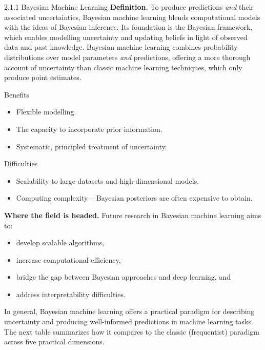 \documentclass[aspectratio=169,10pt]{beamer}
\begin{document}
\begin{frame}[allowframebreaks]{2.1.1 Bayesian Machine Learning}
  \textbf{Definition.} To produce predictions \emph{and} their associated
  uncertainties, Bayesian machine learning blends computational models with
  the ideas of Bayesian inference. Its foundation is the Bayesian framework,
  which enables modelling uncertainty and updating beliefs in light of
  observed data and past knowledge. Bayesian machine learning combines
  probability distributions over model parameters \emph{and} predictions,
  offering a more thorough account of uncertainty than classic machine
  learning techniques, which only produce point estimates.

  \begin{block}{Benefits}
    \begin{itemize}
      \item Flexible modelling.
      \item The capacity to incorporate prior information.
      \item Systematic, principled treatment of uncertainty.
    \end{itemize}
  \end{block}

  \framebreak

  \begin{block}{Difficulties}
    \begin{itemize}
      \item Scalability to large datasets and high-dimensional models.
      \item Computing complexity -- Bayesian posteriors are often expensive
        to obtain.
    \end{itemize}
  \end{block}

  \textbf{Where the field is headed.} Future research in Bayesian machine
  learning aims to:
  \begin{itemize}
    \item develop scalable algorithms,
    \item increase computational efficiency,
    \item bridge the gap between Bayesian approaches and deep learning, and
    \item address interpretability difficulties.
  \end{itemize}

  In general, Bayesian machine learning offers a practical paradigm for
  describing uncertainty and producing well-informed predictions in machine
  learning tasks. The next table summarizes how it compares to the classic
  (frequentist) paradigm across five practical dimensions.
\end{frame}
\end{document}
